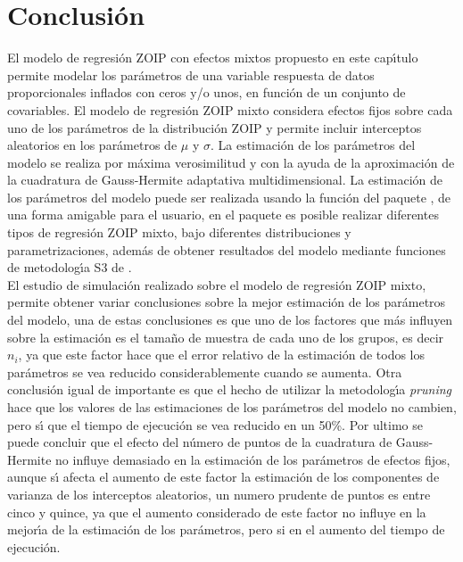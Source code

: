 
\section{Conclusi\'{o}n}

El modelo de regresi\'{o}n ZOIP con efectos mixtos propuesto en este cap\'{\i}tulo permite modelar los par\'{a}metros de una variable respuesta de datos proporcionales inflados con ceros y/o unos, en funci\'{o}n de un conjunto de covariables. El modelo de regresi\'{o}n ZOIP mixto considera efectos fijos sobre cada uno de los par\'{a}metros de la distribuci\'{o}n ZOIP y permite incluir interceptos aleatorios en los par\'{a}metros de $\mu$ y $\sigma$. La estimaci\'{o}n de los par\'{a}metros del modelo se realiza por m\'{a}xima verosimilitud y con la ayuda de la aproximaci\'{o}n de la cuadratura de Gauss-Hermite adaptativa multidimensional. La estimaci\'{o}n de los par\'{a}metros del modelo puede ser realizada usando la funci\'{o}n  del paquete , de una forma amigable para el usuario, en el paquete es posible realizar diferentes tipos de regresi\'{o}n ZOIP mixto, bajo diferentes distribuciones y parametrizaciones, adem\'{a}s de obtener resultados del modelo mediante funciones de metodolog\'{\i}a S3 de .\\

El estudio de simulaci\'{o}n realizado sobre el modelo de regresi\'{o}n ZOIP mixto, permite obtener variar conclusiones sobre la mejor estimaci\'{o}n de los par\'{a}metros del modelo, una de estas conclusiones es que uno de los factores que m\'{a}s influyen sobre la estimaci\'{o}n es el tama\~{n}o de muestra de cada uno de los grupos, es decir $n_i$, ya que este factor hace que el error relativo de la estimaci\'{o}n de todos los par\'{a}metros se vea reducido considerablemente cuando se aumenta. Otra conclusi\'{o}n igual de importante es que el hecho de utilizar la metodolog\'{\i}a \textit{pruning} hace que los valores de las estimaciones de los par\'{a}metros del modelo no cambien, pero s\'{\i} que el tiempo de ejecuci\'{o}n se vea reducido en un 50\%. Por ultimo se puede concluir que el efecto del n\'{u}mero de puntos de la cuadratura de Gauss-Hermite no influye demasiado en la estimaci\'{o}n de los par\'{a}metros de efectos fijos, aunque s\'{\i} afecta el aumento de este factor la estimaci\'{o}n de los componentes de varianza de los interceptos aleatorios, un numero prudente de puntos es entre cinco y quince, ya que el aumento considerado de este factor no influye en la mejor\'{\i}a de la estimaci\'{o}n de los par\'{a}metros, pero si en el aumento del tiempo de ejecuci\'{o}n.   